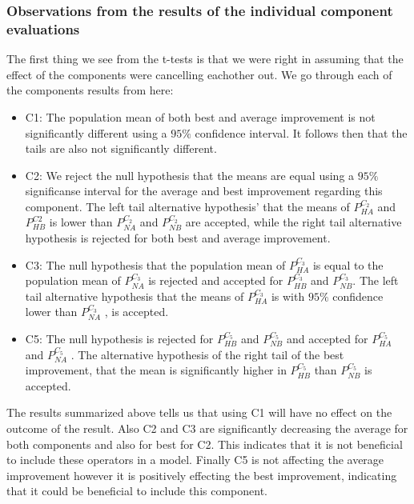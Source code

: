 \documentclass[../main.tex]{subfiles}
\begin{document}
\subsubsection{Observations from the results of the individual component evaluations}
The first thing we see from the t-tests is that we were right in assuming that the effect of the components were cancelling eachother out. 
We go through each of the components results from  here:
\begin{itemize}
    \item C1: The population mean of both best and average improvement is not significantly different using a $95\%$ confidence interval. It follows then that the tails are also not significantly different.
    \item C2: We reject the null hypothesis that the means are equal using a $95\%$ significanse interval for the average and best improvement regarding this component. 
        The left tail alternative hypothesis' that the means of $P^{C_2}_{HA}$ and $P^{C2}_{HB}$ is lower than $P^{C_2}_{NA}$ and $P^{C_2}_{NB}$ are accepted, while the right tail alternative hypothesis is rejected for both best and average improvement.
    \item C3: The null hypothesis that the population mean of $P^{C_3}_{HA}$ is equal to the population mean of $P^{C_3}_{NA}$ is rejected and accepted for $P^{C_3}_{HB}$ and $P^{C_3}_{NB}$. The left tail alternative hypothesis that the means of $P^{C_3}_{HA}$ is with $95\%$ confidence lower than $P^{C_3}_{NA}$ , is accepted.
    \item C5: The null hypothesis is rejected for  $P^{C_5}_{HB}$ and  $P^{C_5}_{NB}$ and accepted for $P^{C_5}_{HA}$ and $P^{C_5}_{NA}$ . The alternative hypothesis of the right tail of the best improvement, that the mean is significantly higher in $P^{C_5}_{HB}$ than  $P^{C_5}_{NB}$ is accepted.
\end{itemize}

The results summarized above tells us that using C1 will have no effect on the outcome of the result. 
Also C2 and C3 are significantly decreasing the average for both components and also for best for C2. 
This indicates that it is not beneficial to include these operators in a model.
Finally C5 is not affecting the average improvement however it is positively effecting the best improvement, indicating that it could be beneficial to include this component.
\end{document}
